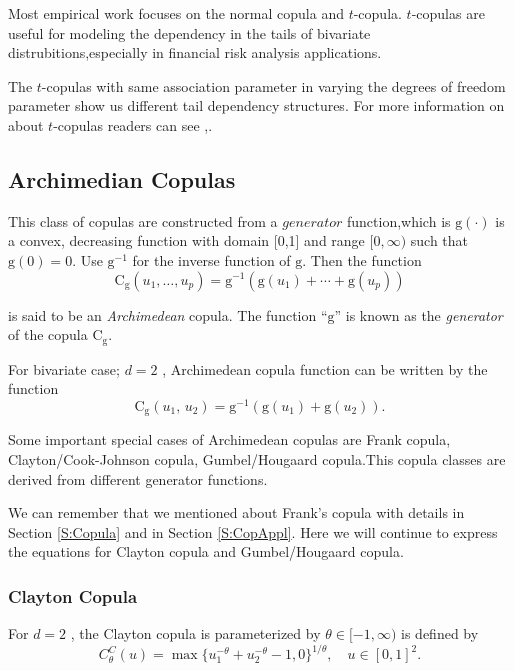\documentclass[]{book}
\theoremstyle{definition}
\theoremstyle{definition}
\theoremstyle{definition}
\theoremstyle{remark}
\begin{document}
Most empirical work focuses on the normal copula and \(t\)-copula.
\(t\)-copulas are useful for modeling the dependency in the tails of
bivariate distrubitions,especially in financial risk analysis
applications.

The \(t\)-copulas with same association parameter in varying the degrees
of freedom parameter show us different tail dependency structures. For
more information on about \(t\)-copulas readers can see
\citep{joe2014dependence},\citep{yan2017elements}.

\subsection{Archimedian Copulas}\label{archimedian-copulas}

This class of copulas are constructed from a \(generator\)
function,which is \(\mathrm{g}(\cdot)\) is a convex, decreasing function
with domain {[}0,1{]} and range \([0, \infty)\) such that
\(\mathrm{g}(0)=0\). Use \(\mathrm{g}^{-1}\) for the inverse function of
\(\mathrm{g}\). Then the function
\[\mathrm{C}_{\mathrm{g}}(u_1, \ldots, u_p) = \mathrm{g}^{-1} \left(
\mathrm{g}(u_1)+ \cdots + \mathrm{g}(u_p) \right)\]

is said to be an \emph{Archimedean} copula. The function
``\(\mathrm{g}\)'' is known as the \emph{generator} of the copula
\(\mathrm{C}_{\mathrm{g}}\).

For bivariate case; \(d=2\) , Archimedean copula function can be written
by the function
\[\mathrm{C}_{\mathrm{g}}(u_1, \, u_2) = \mathrm{g}^{-1} \left(
\mathrm{g}(u_1) + \mathrm{g}(u_2) \right).\]

Some important special cases of Archimedean copulas are Frank copula,
Clayton/Cook-Johnson copula, Gumbel/Hougaard copula.This copula classes
are derived from different generator functions.

We can remember that we mentioned about Frank's copula with details in
Section \ref{S:Copula} and in Section \ref{S:CopAppl}. Here we will
continue to express the equations for Clayton copula and Gumbel/Hougaard
copula.

\subsubsection{Clayton Copula}\label{clayton-copula}

For \(d=2\) , the Clayton copula is parameterized by
\(\theta \in [-1,\infty)\) is defined by
\[C_{\theta}^C(u)=\max\{u_1^{-\theta}+u_2^{-\theta}-1,0\}^{1/\theta}, \quad u\in[0,1]^2.\]
\end{document}
